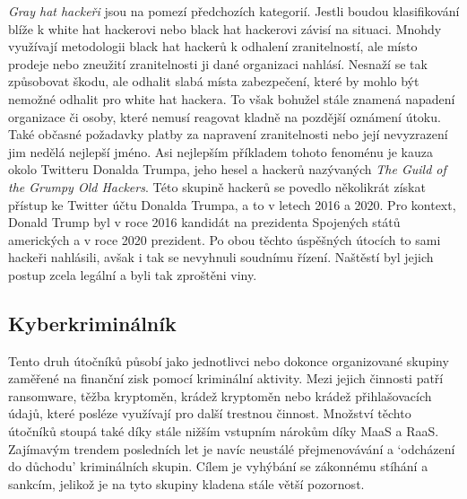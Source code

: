 \textit{Gray hat hackeři} jsou na pomezí předchozích kategorií.
Jestli boudou klasifikování blíže k white hat hackerovi nebo black hat hackerovi závisí na situaci.
Mnohdy využívají metodologii black hat hackerů k odhalení zranitelností, ale místo prodeje nebo zneužití zranitelnosti ji dané organizaci nahlásí.
Nesnaží se tak způsobovat škodu, ale odhalit slabá místa zabezpečení, které by mohlo být nemožné odhalit pro white hat hackera.
To však bohužel stále znamená napadení organizace či osoby, které nemusí reagovat kladně na pozdější oznámení útoku.
Také občasné požadavky platby za napravení zranitelnosti nebo její nevyzrazení jim nedělá nejlepší jméno.
Asi nejlepším příkladem tohoto fenoménu je kauza okolo Twitteru Donalda Trumpa, jeho hesel a hackerů nazývaných \textit{The Guild of the Grumpy Old Hackers}\cite{darknet_87_grumpy}.
Této skupině hackerů se povedlo několikrát získat přístup ke Twitter účtu Donalda Trumpa, a to v letech 2016 a 2020.
Pro kontext, Donald Trump byl v roce 2016 kandidát na prezidenta Spojených států amerických a v roce 2020 prezident.
Po obou těchto úspěšných útocích to sami hackeři nahlásili, avšak i tak se nevyhnuli soudnímu řízení.
Naštěstí byl jejich postup zcela legální a byli tak zproštěni viny.

\subsection{Kyberkriminálník}\label{subsec:cyber-kriminalnik}
Tento druh útočníků působí jako jednotlivci nebo dokonce organizované skupiny zaměřené na finanční zisk pomocí kriminální aktivity.
Mezi jejich činnosti patří ransomware, těžba kryptoměn, krádež kryptoměn nebo krádež přihlašovacích údajů, které posléze využívají pro další trestnou činnost.
Množství těchto útočníků stoupá také díky stále nižším vstupním nárokům díky \ac{MaaS}\cite{MaaS_ATaT} a \ac{RaaS}\cite{RaaS_microsoft}.
Zajímavým trendem posledních let je navíc neustálé přejmenovávání a `odcházení do důchodu' kriminálních skupin.
Cílem je vyhýbání se zákonnému stíhání a sankcím, jelikož je na tyto skupiny kladena stále větší pozornost.

